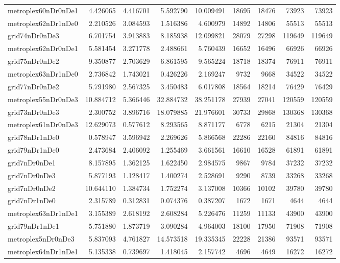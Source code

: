 \begin{longtable}{|l|r|r|r|r|r|r|r|r|}
metroplex60nDr0nDe1 & 4.426065 & 4.416701 & 5.592790 & 10.009491 & 18695 & 18476 & 73923 & 73923 \\
metroplex62nDr1nDe0 & 2.210526 & 3.084593 & 1.516386 & 4.600979 & 14892 & 14806 & 55513 & 55513 \\
grid74nDr0nDe3 & 6.701754 & 3.913883 & 8.185938 & 12.099821 & 28079 & 27298 & 119649 & 119649 \\
metroplex62nDr0nDe1 & 5.581454 & 3.271778 & 2.488661 & 5.760439 & 16652 & 16496 & 66926 & 66926 \\
grid75nDr0nDe2 & 9.350877 & 2.703629 & 6.861595 & 9.565224 & 18718 & 18374 & 76911 & 76911 \\
metroplex63nDr1nDe0 & 2.736842 & 1.743021 & 0.426226 & 2.169247 & 9732 & 9668 & 34522 & 34522 \\
grid77nDr0nDe2 & 5.791980 & 2.567325 & 3.450483 & 6.017808 & 18564 & 18214 & 76429 & 76429 \\
metroplex55nDr0nDe3 & 10.884712 & 5.366446 & 32.884732 & 38.251178 & 27939 & 27041 & 120559 & 120559 \\
grid73nDr0nDe3 & 2.300752 & 3.896716 & 18.079885 & 21.976601 & 30733 & 29868 & 130368 & 130368 \\
metroplex61nDr0nDe3 & 12.629073 & 0.577612 & 8.293565 & 8.871177 & 6778 & 6215 & 21304 & 21304 \\
grid78nDr1nDe0 & 0.578947 & 3.596942 & 2.269626 & 5.866568 & 22286 & 22160 & 84816 & 84816 \\
grid79nDr1nDe0 & 2.473684 & 2.406092 & 1.255469 & 3.661561 & 16610 & 16528 & 61891 & 61891 \\
grid7nDr0nDe1 & 8.157895 & 1.362125 & 1.622450 & 2.984575 & 9867 & 9784 & 37232 & 37232 \\
grid7nDr0nDe3 & 5.877193 & 1.128417 & 1.400274 & 2.528691 & 9290 & 8739 & 33268 & 33268 \\
grid7nDr0nDe2 & 10.644110 & 1.384734 & 1.752274 & 3.137008 & 10366 & 10102 & 39780 & 39780 \\
grid7nDr1nDe0 & 2.315789 & 0.312831 & 0.074376 & 0.387207 & 1672 & 1671 & 4644 & 4644 \\
metroplex63nDr1nDe1 & 3.155389 & 2.618192 & 2.608284 & 5.226476 & 11259 & 11133 & 43900 & 43900 \\
grid79nDr1nDe1 & 5.751880 & 1.873719 & 3.090284 & 4.964003 & 18100 & 17950 & 71908 & 71908 \\
metroplex5nDr0nDe3 & 5.837093 & 4.761827 & 14.573518 & 19.335345 & 22228 & 21386 & 93571 & 93571 \\
metroplex64nDr1nDe1 & 5.135338 & 0.739697 & 1.418045 & 2.157742 & 4696 & 4649 & 16272 & 16272 \\

\end{longtable}
